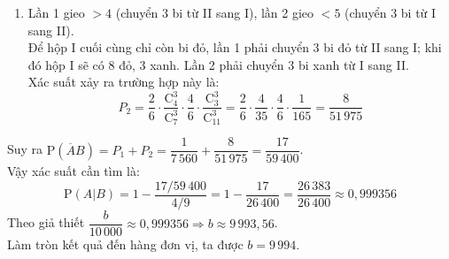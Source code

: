\begin{ex}
{\begin{enumerate}[\it TH 1:]
			\item Lần 1 gieo $>4$ (chuyển $3$ bi từ II sang I), lần 2 gieo $<5$ (chuyển $3$ bi từ I sang II).\\
			Để hộp I cuối cùng chỉ còn bi đỏ, lần 1 phải chuyển $3$ bi đỏ từ II sang I; khi đó hộp I sẽ có $8$ đỏ, $3$ xanh. Lần 2 phải chuyển $3$ bi xanh từ I sang II.\\
			Xác suất xảy ra trường hợp này là:
			\[ P_2 = \dfrac{2}{6} \cdot \dfrac{\mathrm{C}_4^3}{\mathrm{C}_7^3} \cdot \dfrac{4}{6} \cdot \dfrac{\mathrm{C}_3^3}{\mathrm{C}_{11}^3} = \dfrac{2}{6} \cdot \dfrac{4}{35} \cdot \dfrac{4}{6} \cdot \dfrac{1}{165} = \dfrac{8}{51\,975} \]
		\end{enumerate}
		Suy ra $\mathrm{P}(\overline{A}B) = P_1 + P_2 = \dfrac{1}{7\,560} + \dfrac{8}{51\,975} = \dfrac{17}{59\,400}$.\\
		Vậy xác suất cần tìm là:
		\[ \mathrm{P}(A|B) = 1 - \dfrac{17/59\,400}{4/9} = 1 - \dfrac{17}{26\,400} = \dfrac{26\,383}{26\,400} \approx 0{,}999356 \]
		Theo giả thiết $\dfrac{b}{10\,000} \approx 0{,}999356 \Rightarrow b \approx 9\,993{,}56$.\\
		Làm tròn kết quả đến hàng đơn vị, ta được $b = 9\,994$.
	}
\end{ex}

